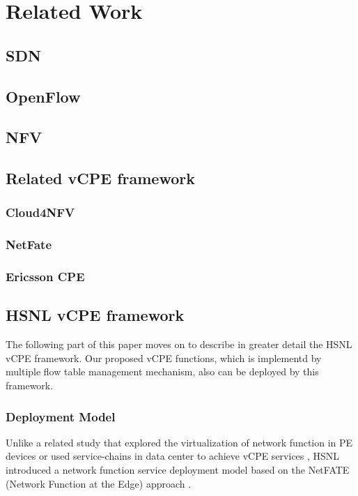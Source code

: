 \chapter{Related Work} \label{ch:related_work}
\section{SDN}



\section{OpenFlow}



\section{NFV}



\section{Related vCPE framework}
\subsection{Cloud4NFV}


\subsection{NetFate}


\subsection{Ericsson CPE}



\section{HSNL vCPE framework}
The following part of this paper moves on to describe in greater detail the HSNL vCPE framework. Our proposed vCPE functions, which is implementd by multiple flow table management mechanism, also can be deployed by this framework.


\subsection{Deployment Model}
Unlike a related study that explored the virtualization of network function in PE devices \cite{vcpe-enhance} or used service-chains in data center to achieve vCPE services \cite{ericcson-vcpe}, HSNL introduced a network function service deployment model based on the NetFATE (Network Function at the Edge) approach \cite{netfate}.

